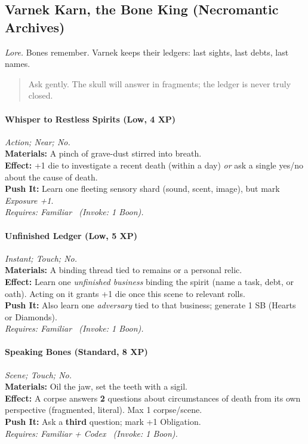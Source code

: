 
\subsection{Varnek Karn, the Bone King (Necromantic Archives)}
\textit{Lore.} Bones remember. Varnek keeps their ledgers: last sights, last debts, last names.

\begin{quote}
Ask gently. The skull will answer in fragments; the ledger is never truly closed.
\end{quote}

\paragraph{Whisper to Restless Spirits (Low, 4 XP)} \emph{Action; Near; No.}\\
\textbf{Materials:} A pinch of grave-dust stirred into breath.\\
\textbf{Effect:} +1 die to investigate a recent death (within a day) \emph{or} ask a single yes/no about the cause of death.\\
\textbf{Push It:} Learn one fleeting sensory shard (sound, scent, image), but mark \emph{Exposure +1}.\\
\emph{Requires: Familiar \ (\textit{Invoke:} 1 Boon).}

\paragraph{Unfinished Ledger (Low, 5 XP)} \emph{Instant; Touch; No.}\\
\textbf{Materials:} A binding thread tied to remains or a personal relic.\\
\textbf{Effect:} Learn one \emph{unfinished business} binding the spirit (name a task, debt, or oath). Acting on it grants +1 die once this scene to relevant rolls.\\
\textbf{Push It:} Also learn one \emph{adversary} tied to that business; generate 1 SB (Hearts or Diamonds).\\
\emph{Requires: Familiar \ (\textit{Invoke:} 1 Boon).}

\paragraph{Speaking Bones (Standard, 8 XP)} \emph{Scene; Touch; No.}\\
\textbf{Materials:} Oil the jaw, set the teeth with a sigil.\\
\textbf{Effect:} A corpse answers \textbf{2} questions about circumstances of death from its own perspective (fragmented, literal). Max 1 corpse/scene.\\
\textbf{Push It:} Ask a \textbf{third} question; mark +1 Obligation.\\
\emph{Requires: Familiar + Codex \ (\textit{Invoke:} 1 Boon).}

